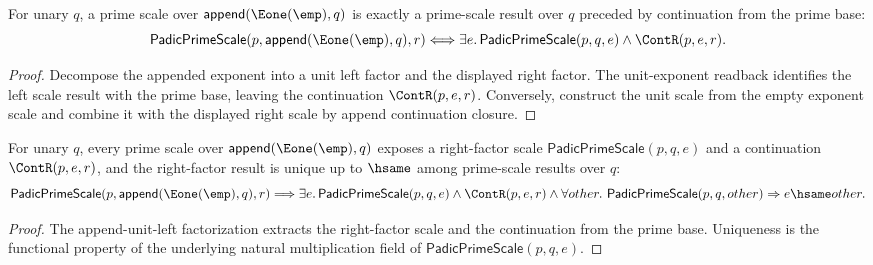 \begin{theorem}
\label{thm:padic-prime-scale-append-unit-left-factorization}
For unary $q$, a prime scale over $\mathsf{append}(\Eone(\emp),q)$ is exactly a
prime-scale result over $q$ preceded by continuation from the prime base:
$$
\mathsf{PadicPrimeScale}(p,\mathsf{append}(\Eone(\emp),q),r)
\Longleftrightarrow
\exists e.\,\mathsf{PadicPrimeScale}(p,q,e)\land\ContR(p,e,r).
$$
\end{theorem}
\begin{proof}
Decompose the appended exponent into a unit left factor and the displayed
right factor. The unit-exponent readback identifies the left scale result with
the prime base, leaving the continuation $\ContR(p,e,r)$. Conversely, construct
the unit scale from the empty exponent scale and combine it with the displayed
right scale by append continuation closure.
\end{proof}

\begin{theorem}
\label{thm:padic-prime-scale-append-unit-left-predecessor-unique}
For unary $q$, every prime scale over
$\mathsf{append}(\Eone(\emp),q)$ exposes a right-factor scale
$\mathsf{PadicPrimeScale}(p,q,e)$ and a continuation $\ContR(p,e,r)$, and
the right-factor result is unique up to $\hsame$ among prime-scale results over
$q$:
$$
\mathsf{PadicPrimeScale}(p,\mathsf{append}(\Eone(\emp),q),r)
\Longrightarrow
\exists e.\,
\mathsf{PadicPrimeScale}(p,q,e)\land\ContR(p,e,r)\land
\forall other.\ \mathsf{PadicPrimeScale}(p,q,other)\Rightarrow e\hsame other.
$$
\end{theorem}
\begin{proof}
The append-unit-left factorization extracts the right-factor scale and the
continuation from the prime base. Uniqueness is the functional property of the
underlying natural multiplication field of $\mathsf{PadicPrimeScale}(p,q,e)$.
\end{proof}

